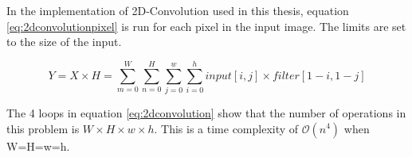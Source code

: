 In the implementation of 2D-Convolution used in this thesis, equation \ref{eq:2dconvolutionpixel} is run for each pixel in the input image.
The limits are set to the size of the input.

\begin{equation} \label{eq:2dconvolution}
  Y = X \times H = \sum\limits_{m=0}^W \sum\limits_{n=0}^H \sum\limits_{j=0}^{w} \sum\limits_{i=0}^{h} input[i,j] \times filter[1-i, 1-j]
\end{equation}

The 4 loops in equation \ref{eq:2dconvolution} show that the number of operations in this problem is $W\times H\times w\times h$.
This is a time complexity of $\mathcal{O}(n^4)$ when W=H=w=h\cite{PrinciplesOfDigitalImage}. %

